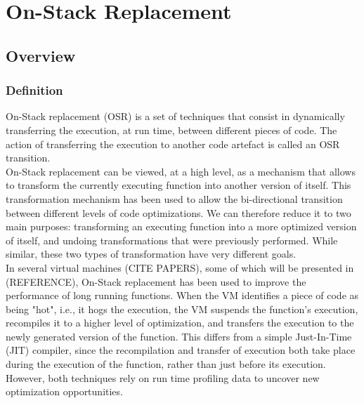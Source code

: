 
\chapter{On-Stack Replacement} %

\label{Chapter2} %


\newcommand{\keyword}[1]{\textbf{#1}}
\newcommand{\tabhead}[1]{\textbf{#1}}
\newcommand{\code}[1]{\texttt{#1}}
\newcommand{\file}[1]{\texttt{\bfseries#1}}
\newcommand{\option}[1]{\texttt{\itshape#1}}

\section{Overview}
\subsection{Definition}
On-Stack replacement (OSR) is a set of techniques that consist in dynamically transferring the execution, at run time, between different pieces of code.
The action of transferring the execution to another code artefact is called an OSR transition.\\

On-Stack replacement can be viewed, at a high level, as a mechanism that allows to transform the currently executing function into another version of itself.
This transformation mechanism has been used to allow the bi-directional transition between different levels of code optimizations.
We can therefore reduce it to two main purposes: transforming an executing function into a more optimized version of itself, and undoing transformations that were previously performed.
While similar, these two types of transformation have very different goals.\\

In several virtual machines (CITE PAPERS), some of which will be presented in (REFERENCE), On-Stack replacement has been used to improve the performance of long running functions.
When the VM identifies a piece of code as being "hot", i.e., it hogs the execution, the VM suspends the function's execution, recompiles it to a higher level of optimization, and transfers the execution to the newly generated version of the function.
This differs from a simple Just-In-Time (JIT) compiler, since the recompilation and transfer of execution both take place during the execution of the function, rather than just before its execution.
However, both techniques rely on run time profiling data to uncover new optimization opportunities.\\

